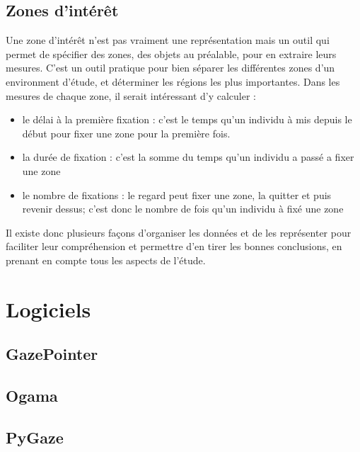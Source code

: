 \documentclass[12pt]{article}
\begin{document}
\subsection{Zones d'intérêt}

Une zone d'intérêt n'est pas vraiment une représentation mais un outil qui
permet de spécifier des zones, des objets au préalable, pour en extraire leurs
mesures. C'est un outil pratique pour bien séparer les différentes zones d'un
environment d'étude, et déterminer les régions les plus importantes. Dans les
mesures de chaque zone, il serait intéressant d'y calculer :

\begin{itemize}
  \item le délai à la première fixation : c'est le temps qu'un individu à mis
        depuis le début pour fixer une zone pour la première fois.
  \item la durée de fixation : c'est la somme du temps qu'un individu a passé a
        fixer une zone
  \item le nombre de fixations : le regard peut fixer une zone, la quitter et
        puis revenir dessus; c'est donc le nombre de fois qu'un individu à fixé
        une zone
\end{itemize}

\bigskip
Il existe donc plusieurs façons d'organiser les données et de les représenter
pour faciliter leur compréhension et permettre d'en tirer les bonnes
conclusions, en prenant en compte tous les aspects de l'étude.


\section{Logiciels}

\subsection{GazePointer}

\subsection{Ogama}

\subsection{PyGaze}
\end{document}
